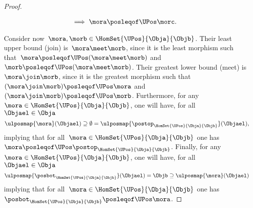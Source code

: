 \begin{proof}
\begin{itemize}
\begin{equation*}
\begin{aligned}
                       & \implies \mora \posleqof\UPos \morc.
                  \end{aligned}
              \end{equation*}
    \end{itemize}
    Consider now~$\mora,\morb \in \HomSet{\UPos}{\Obja}{\Objb}$.
    Their least upper bound (join) is~$\mora \meet \morb$, since it is the least morphism such that~$\mora \posleqof\UPos (\mora \meet \morb)$ and~$\morb \posleqof\UPos (\mora \meet \morb)$.
    Their greatest lower bound (meet) is~$\mora \join \morb$, since it is the greatest morphism such that~$(\mora \join \morb)\posleqof\UPos \mora $ and~$(\mora \join \morb)\posleqof\UPos \morb$.
    Furthermore, for any~$\mora \in \HomSet{\UPos}{\Obja}{\Objb}$, one will have, for all~$\Objael \in \Obja$
    \begin{equation*}
        \ulposmap{\mora}(\Objael) \supseteq \emptyset=\ulposmap{\postop_{\HomSet{\UPos}{\Obja}{\Objb}}}(\Objael),
    \end{equation*}
    implying that for all~$\mora \in \HomSet{\UPos}{\Obja}{\Objb}$ one has~$\mora \posleqof\UPos \postop_{\HomSet{\UPos}{\Obja}{\Objb}}$.
    Finally, for any~$\mora \in \HomSet{\UPos}{\Obja}{\Objb}$, one will have, for all~$\Objael \in \Obja$
    \begin{equation*}
        \ulposmap{\posbot_{\HomSet{\UPos}{\Obja}{\Objb}}}(\Objael)=\Objb \supseteq \ulposmap{\mora}(\Objael)
    \end{equation*}
    implying that for all~$\mora \in \HomSet{\UPos}{\Obja}{\Objb}$ one has~$\posbot_{\HomSet{\UPos}{\Obja}{\Objb}}\posleqof\UPos \mora$.
\end{proof}

